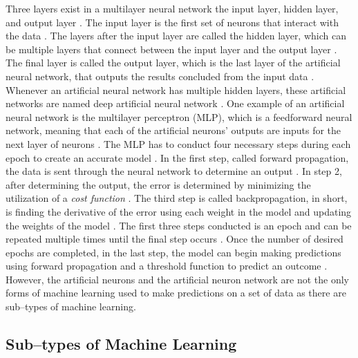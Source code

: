 \documentclass[a4paper, 12pt]{article}
\begin{document}
\begin{paragraph}
\indent Three layers exist in a multilayer neural network the input layer, hidden layer, and output layer \cite{pythonML}. The input layer is the first set of neurons that interact with the data \cite{pythonML}. The layers after the input layer are called the hidden layer, which can be multiple layers that connect between the input layer and the output layer \cite{pythonML}. The final layer is called the output layer, which is the last layer of the artificial neural network, that outputs the results concluded from the input data \cite{pythonML}. Whenever an artificial neural network has multiple hidden layers, these artificial networks are named deep artificial neural network \cite{pythonML}. One example of an artificial neural network is the multilayer perceptron (MLP), which is a feedforward neural network, meaning that each of the artificial neurons' outputs are inputs for the next layer of neurons \cite{pythonML}. The MLP has to conduct four necessary steps during each epoch to create an accurate model \cite{pythonML}. In the first step, called forward propagation, the data is sent through the neural network to determine an output \cite{pythonML}. In step 2, after determining the output, the error is determined by minimizing the utilization of a \textit{cost function} \cite{pythonML}. The third step is called backpropagation, in short, is finding the derivative of the error using each weight in the model and updating the weights of the model \cite{pythonML}. The first three steps conducted is an epoch and can be repeated multiple times until the final step occurs \cite{pythonML}. Once the number of desired epochs are completed, in the last step, the model can begin making predictions using forward propagation and a threshold function to predict an outcome \cite{pythonML}. However, the artificial neurons and the artificial neuron network are not the only forms of machine learning used to make predictions on a set of data as there are sub--types of machine learning.

\end{paragraph}

\subsection{Sub--types of Machine Learning}
\end{document}
